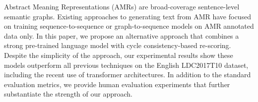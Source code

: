 Abstract Meaning Representations (AMRs) are broad-coverage sentence-level semantic graphs. Existing approaches to generating text from AMR have focused on training sequence-to-sequence or graph-to-sequence models on AMR annotated data only. In this paper, we propose an alternative approach that combines a strong pre-trained language model with cycle consistency-based re-scoring. Despite the simplicity of the approach, our experimental results show these models outperform all previous techniques on the English LDC2017T10 dataset, including the recent use of transformer architectures. In addition to the standard evaluation metrics, we provide human evaluation experiments that further substantiate the strength of our approach.
